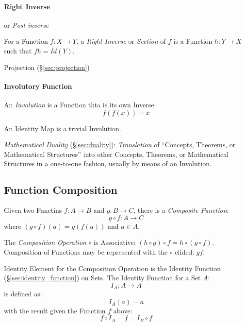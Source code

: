 \paragraph{Right Inverse}\label{sec:right_inverse}\hfill

or \emph{Post-inverse}

For a Function $f: X \to Y$, a \emph{Right Inverse} or
\emph{Section} of $f$ is a Function $h: Y \to X$ such that $fh
= Id(Y)$.

Projection (\S\ref{sec:projection})



\paragraph{Involutory Function}\label{sec:involution}\hfill

An \emph{Involution} is a Function thta is its own Inverse:
\[
  f(f(x)) = x
\]

An Identity Map is a trivial Involution.

\fist \emph{Mathematical Duality} (\S\ref{sec:duality}): \emph{Translation} of
``Concepts, Theorems, or Mathematical Structures'' into other Concepts,
Theorems, or Mathematical Structures in a one-to-one fashion, usually by means
of an Involution.



\subsection{Function Composition}\label{sec:function_composition}

Given two Functins $f : A \to B$ and $g : B \to C$,
there is a \emph{Composite Function}:
\[
  g \circ f : A \to C
\]
where $(g \circ f)(a) = g(f(a))$ and $a \in A$.

The \emph{Composition Operation} $\circ$ is Associative: $(h \circ g)
\circ f = h \circ (g \circ f)$. Composition of Functions may be
represented with the $\circ$ elided: $gf$.

Identity Element for the Composition Operation is the Identity
Function (\S\ref{sec:identity_function}) on Sets. The Identity
Function for a Set $A$:
\[
  I_A : A \to A
\]
is defined as:
\[
  I_A(a) = a
\]
with the result given the Function $f$ above:
\[
  f \circ I_A = f = I_B \circ f
\]



